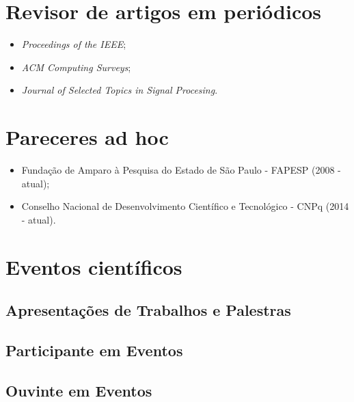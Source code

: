 \section{Revisor de artigos em periódicos}

\begin{itemize}
    \item \textit{Proceedings of the IEEE};
    \item \textit{ACM Computing Surveys};
    \item \textit{Journal of Selected Topics in Signal Procesing}.
\end{itemize}

\section{Pareceres ad hoc}

\begin{itemize}
    \item Fundação de Amparo à Pesquisa do Estado de São Paulo - FAPESP (2008 - atual);
    \item Conselho Nacional de Desenvolvimento Científico e Tecnológico - CNPq  (2014 - atual).
\end{itemize}

\section{Eventos científicos}

\subsection{Apresentações de Trabalhos e Palestras}



\subsection{Participante em Eventos}



\subsection{Ouvinte em Eventos}





